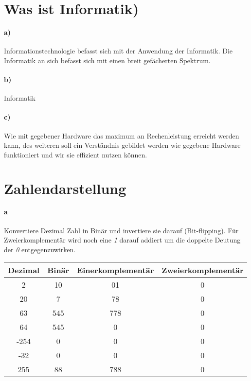 \documentclass{article}
\begin{document}
\maketitle
\section{Was ist Informatik)}
\paragraph{a)}
Informationstechnologie befasst sich mit der Anwendung der Informatik. Die Informatik an sich befasst sich mit einen breit gefächerten Spektrum.
\paragraph{b)}
Informatik
\paragraph{c)}
Wie mit gegebener Hardware das maximum an Rechenleistung erreicht werden kann, des weiteren soll ein Verständnis gebildet werden wie gegebene Hardware funktioniert und wir sie effizient nutzen können.


\section{Zahlendarstellung}
\paragraph{a}
Konvertiere Dezimal Zahl in Binär und invertiere sie darauf (Bit-flipping).
Für Zweierkomplementär wird noch eine \textit{1} darauf addiert um die doppelte Deutung der \textit{0} entgegenzuwirken.
\begin{center}
\begin{tabular}{||c c c c ||} 
 \hline
 Dezimal & Binär &  Einerkomplementär & Zweierkomplementär  \\ [0.5ex] 
 \hline\hline
 2 & 10 & 01 & 0  \\ 
 \hline
 20 & 7 & 78 & 0\\
 \hline
 63 & 545 & 778 & 0\\
 \hline
 64 & 545 & 0 & 0  \\
 \hline
 -254 & 0 & 0& 0 \\
 \hline
 -32 & 0 & 0 & 0\\
 \hline
 255 & 88 & 788 & 0\\ [1ex] 
 \hline
\end{tabular}
\end{center}
\end{document}
